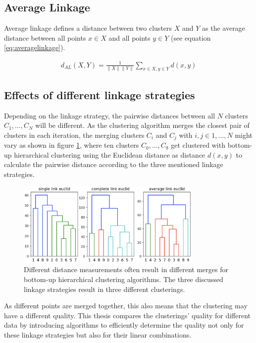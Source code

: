 \subsection{Average Linkage}

Average linkage defines a distance between two clusters $X$ and $Y$ as the average distance between all points $x \in X$ and all points $y \in Y$ (see equation \ref{eq:averagelinkage}).

\begin{equation}
    \begin{aligned}
        d_{AL}(X,Y) = \frac{1}{\|X\|\|Y\|}\sum\limits_{x \in X, y \in Y} d(x,y)
    \end{aligned}
    \label{eq:averagelinkage}
\end{equation}

\subsection{Effects of different linkage strategies}

Depending on the linkage strategy, the pairwise distances between all $N$ clusters $C_1, ..., C_N$ will be different. As the clustering algorithm merges the closest pair of clusters in each iteration, the merging clusters $C_i$ and $C_j$ with $i, j \in 1,...,N$ might vary as shown in figure \ref{fig:linkage_effects}, where ten clusters $C_0, ..., C_9$ get clustered with bottom-up hierarchical clustering using the Euclidean distance as distance $d(x,y)$ to calculate the pairwise distance according to the three mentioned linkage strategies.

\begin{figure}[h]
    \centering
    \includegraphics[width=0.8\textwidth]{images/linkage_effects}
    \caption{Different distance measurements often result in different merges for bottom-up hierarchical clustering algorithms. The three discussed linkage strategies result in three different clusterings.}
    \label{fig:linkage_effects}
\end{figure}

As different points are merged together, this also means that the clustering may have a different quality. This thesis compares the clusterings' quality for different data by introducing algorithms to efficiently determine the quality not only for these linkage strategies but also for their linear combinations.
